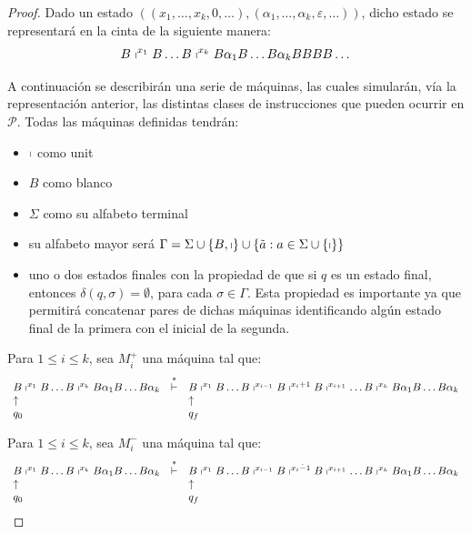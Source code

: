  \begin{proof}
    \PN Dado un estado $((x_{1}, \dotsc, x_{k}, 0, \dotsc),(\alpha_{1}, \dotsc, \alpha_{k}, \varepsilon, \dotsc))$,
    dicho estado se representará en la cinta de la siguiente manera:
    \[
      B \shortmid^{x_{1}} B \dotsc B \shortmid^{x_{k}} B \alpha_{1} B \dotsc B \alpha_{k} BBBB \dotsc
    \]

    \PN A continuación se describirán una serie de máquinas, las cuales simularán, vía la representación anterior, las
    distintas clases de instrucciones que pueden ocurrir en $\mathcal{P}$. Todas las máquinas definidas tendrán:

    \begin{itemize}
      \item $\shortmid$ como unit
      \item $B$ como blanco
      \item $\Sigma$ como su alfabeto terminal
      \item su alfabeto mayor será $\Gamma = \Sigma \cup \{B, \shortmid\} \cup \{\tilde{a}: a \in \Sigma \cup
        \{\shortmid\}\}$
      \item uno o dos estados finales con la propiedad de que si $q$ es un estado final, entonces $\delta (q,\sigma) =
        \emptyset$, para cada $\sigma \in \Gamma$.
        \PN Esta propiedad es importante ya que permitirá concatenar pares de
        dichas máquinas identificando algún estado final de la primera con el inicial de la segunda. \\
    \end{itemize}

    \PN Para $1 \leq i \leq k$, sea $M_{i}^{+}$ una máquina tal que:
    \[
      \begin{array}{lcl}
        B \shortmid^{x_{1}} B \dotsc B \shortmid^{x_{k}} B \alpha_{1} B \dotsc B \alpha_{k} &\overset{\ast}{\vdash}& B
        \shortmid^{x_{1}} B \dotsc B \shortmid^{x_{i-1}} B \shortmid^{x_{i}+1} B \shortmid^{x_{i+1}} \dotsc B
        \shortmid^{x_{k}} B \alpha_{1} B \dotsc B \alpha_{k} \\
        \uparrow && \uparrow \\
        q_{0} & & q_{f}
      \end{array}
    \]

    \PN Para $1 \leq i \leq k$, sea $M_{i}^{\dot{-}}$ una máquina tal que:
    \[
      \begin{array}{lcl}
        B \shortmid^{x_{1}} B \dotsc B \shortmid^{x_{k}} B \alpha_{1} B \dotsc B \alpha_{k} &\overset{\ast}{\vdash}& B
          \shortmid^{x_{1}} B \dotsc B \shortmid^{x_{i-1}} B \shortmid^{x_{i} \dot{-} 1} B \shortmid^{x_{i+1}} \dotsc B
          \shortmid^{x_{k}} B \alpha_{1} B \dotsc B \alpha_{k} \\
        \uparrow && \uparrow \\
        q_{0} && q_{f}
      \end{array}
    \]


\end{proof}
